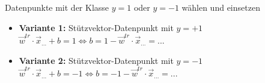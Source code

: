 \begin{enumerate}
        Datenpunkte mit der Klasse $y = 1$ oder $y = -1$ wählen und einsetzen
        \begin{itemize}
            \item \textbf{Variante 1:} Stützvektor-Datenpunkt mit $y = +1$\\
                $\boxed{\vec{w}^{tr}\cdot\vec{x}_{...} + b = 1} \Leftrightarrow  \boxed{b = 1 -\vec{w}^{tr}\cdot\vec{x}_{...} = ...}$
            \item \textbf{Variante 2:} Stützvektor-Datenpunkt mit $y = -1$\\
                $\boxed{\vec{w}^{tr}\cdot\vec{x}_{...} + b = -1} \Leftrightarrow  \boxed{b = -1 -\vec{w}^{tr}\cdot\vec{x}_{...} = ...}$\\
        \end{itemize}
\end{enumerate}





